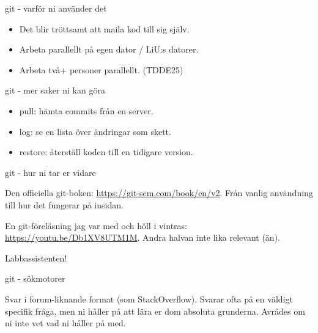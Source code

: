 \documentclass{beamer}
\begin{document}
  \begin{frame}{git - varför ni använder det}

    \pause{}

    \begin{itemize}[<+->]
      \item Det blir tröttsamt att maila kod till sig själv.
      \item Arbeta parallellt på egen dator / LiU:s datorer.
      \item Arbeta två+ personer parallellt. (TDDE25)
    \end{itemize}

  \end{frame}

  \begin{frame}{git - mer saker ni kan göra}

    \begin{itemize}
      \item pull: hämta commits från en server.
      \item log: se en lista över ändringar som skett.
      \item restore: återställ koden till en tidigare version.
    \end{itemize}

  \end{frame}

  \begin{frame}{git - hur ni tar er vidare}

    \pause{}

    Den officiella git-boken: \url{https://git-scm.com/book/en/v2}. Från vanlig
    användning till hur det fungerar på insidan.

    \pause{}

    En git-föreläsning jag var med och höll i vintras:
    \url{https://youtu.be/Db1XV8UTM1M}. Andra halvan inte lika relevant (än).
    
    \pause{}

    Labbassistenten!

  \end{frame}

  \begin{frame}{git - sökmotorer}

    Svar i forum-liknande format (som StackOverflow). Svarar ofta på en väldigt
    specifik fråga, men ni håller på att lära er dom absoluta grunderna.
    Avrådes om ni inte vet vad ni håller på med.

  \end{frame}
\end{document}
